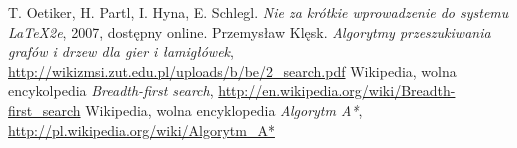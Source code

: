 \documentclass{classrep}
\begin{document}
	
	
	
\begin{thebibliography}{0}
   T. Oetiker, H. Partl, I. Hyna, E. Schlegl.
    \textsl{Nie za krótkie wprowadzenie do systemu \LaTeX2e}, 2007, dostępny
    online.
   Przemysław Klęsk.
    \textsl{Algorytmy przeszukiwania grafów i drzew dla gier i łamigłówek}, \url{http://wikizmsi.zut.edu.pl/uploads/b/be/2_search.pdf}
    Wikipedia, wolna encykolpedia
    \textsl{Breadth-first search}, \url{http://en.wikipedia.org/wiki/Breadth-first_search}
     Wikipedia, wolna encyklopedia
    \textsl{Algorytm A*}, \url{http://pl.wikipedia.org/wiki/Algorytm_A*}
\end{thebibliography}
\end{document}
